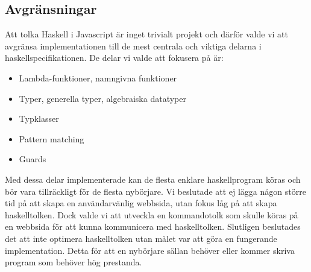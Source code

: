 



\subsection{Avgränsningar} 
Att tolka Haskell i Javascript är inget trivialt projekt och därför valde vi att avgränsa implementationen till de mest centrala och viktiga delarna i haskellspecifikationen. De delar vi valde att fokusera på är:
        \begin{itemize}
            \item{Lambda-funktioner, namngivna funktioner}
            \item{Typer, generella typer, algebraiska datatyper}
            \item{Typklasser}
            \item{Pattern matching}
            \item{Guards}
        \end{itemize}
Med dessa delar implementerade kan de flesta enklare haskellprogram köras och bör vara tillräckligt för de flesta nybörjare. Vi beslutade att ej lägga någon större tid på att skapa en användarvänlig webbsida, utan fokus låg på att skapa haskelltolken. Dock valde vi att utveckla en kommandotolk som skulle köras på en webbsida för att kunna kommunicera med haskelltolken. 
Slutligen beslutades det att inte optimera haskelltolken utan målet var att göra en fungerande implementation. Detta för att en nybörjare sällan behöver eller kommer skriva program som behöver hög prestanda.

